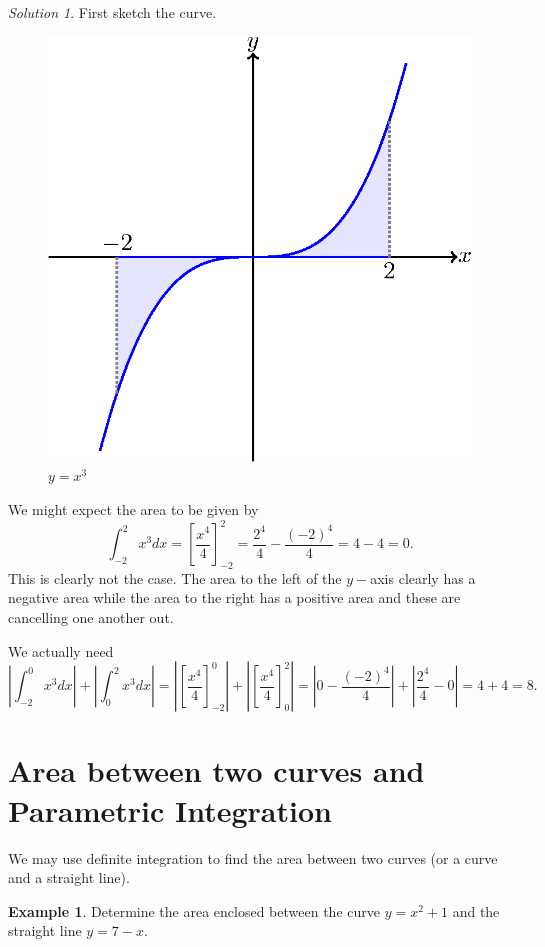 \documentclass[
  11pt,
  oneside]{book}
\newcommand{\slide}{}
\theoremstyle{definition}
\theoremstyle{definition}
\newtheorem{example}{Example}[chapter]
\theoremstyle{definition}
\theoremstyle{definition}
\theoremstyle{remark}
\newtheorem*{solution}{Solution}
\begin{document}
\begin{solution}
First sketch the curve.

\begin{figure}

{\centering \includegraphics[width=0.4\linewidth]{tikztopng-figure24} 

}

\caption{$y=x^3$}\label{fig:unnamed-chunk-45}
\end{figure}

We might expect the area to be given by
\[
\int_{-2}^2x^3dx = \left[\frac{x^4}4\right]_{-2}^2 = \frac{2^4}4-\frac{(-2)^4}4 = 4-4 = 0.
\]
This is clearly not the case. The area to the left of the \(y-\)axis clearly has a negative area while the area to the right has a positive area and these are cancelling one another out.

We actually need
\[
\left|\int_{-2}^0x^3dx\right|+\left|\int_0^2x^3dx\right| = \left|\left[\frac{x^4}4\right]_{-2}^0\right|+\left|\left[\frac{x^4}4\right]_{0}^2\right| = \left|0-\frac{(-2)^4}4\right|+\left|\frac{2^4}4-0\right| = 4+4=8.
\]
\end{solution}

\slide

\section{Area between two curves and Parametric Integration}\label{area-between-two-curves-and-parametric-integration}

We may use definite integration to find the area between two curves (or a curve and a straight line).

\begin{example}
Determine the area enclosed between the curve \(y=x^2+1\) and the straight line \(y=7-x\).
\end{example}
\end{document}
